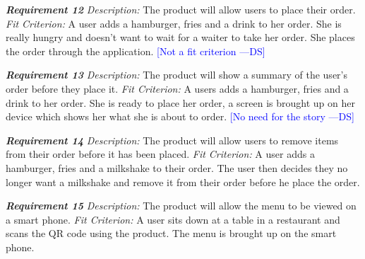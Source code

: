 \documentclass[12pt, titlepage]{article}
\newcommand{\authornote}[3]{\textcolor{#1}{[#3 ---#2]}}
\newcommand{\authornote}[3]{}
\newcommand{\ds}[1]{\authornote{blue}{DS}{#1}}
\begin{document}
\noindent\textbf{\textit{Requirement 12}}\newline
\textit{Description:}\newline
The product will allow users to place their order. \newline\newline
\textit{Fit Criterion:}\newline 
A user adds a hamburger, fries and a drink to her order. She is really hungry and doesn't want to wait for a waiter to take her order. She places the order through the application. \ds{Not a fit criterion}
\newline

\noindent\textbf{\textit{Requirement 13}}\newline
\textit{Description:}\newline
The product will show a summary of the user's order before they place it. \newline\newline
\textit{Fit Criterion:}\newline 
A users adds a hamburger, fries and a drink to her order. She is ready to place her order, a screen is brought up on her device which shows her what she is about to order.
\newline \ds{No need for the story}


\noindent\textbf{\textit{Requirement 14}}\newline
\textit{Description:}\newline
The product will allow users to remove items from their order before it has been placed. \newline\newline
\textit{Fit Criterion:}\newline 
A user adds a hamburger, fries and a milkshake to their order. The user then decides they no longer want a milkshake and remove it from their order before he place the order.
\newline

\noindent\textbf{\textit{Requirement 15}}\newline
\textit{Description:}\newline
The product will allow the menu to be viewed on a smart phone. \newline\newline
\textit{Fit Criterion:}\newline 
A user sits down at a table in a restaurant and scans the QR code using the product. The menu is brought up on the smart phone.
\newline
\end{document}
